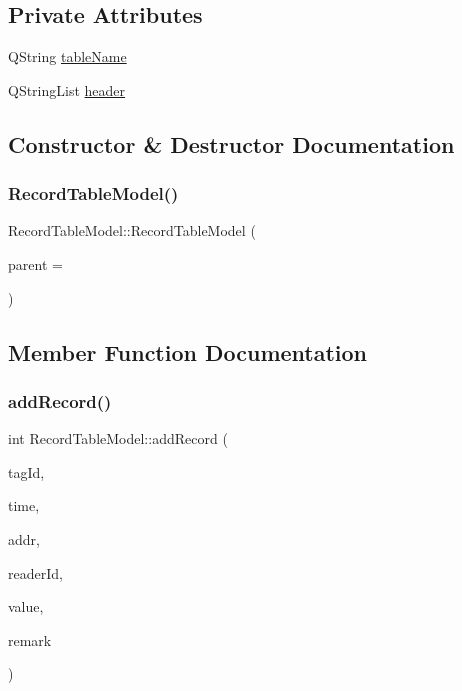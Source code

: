 \subsection*{Private Attributes}
\begin{DoxyCompactItemize}
\item 
Q\+String \mbox{\hyperlink{class_record_table_model_a845184d414cef77094c51f2ce839ff8e}{table\+Name}}
\item 
Q\+String\+List \mbox{\hyperlink{class_record_table_model_aa1e8b825bbdee1a7cb35a236b767cded}{header}}
\end{DoxyCompactItemize}


\subsection{Constructor \& Destructor Documentation}
\mbox{\label{class_record_table_model_a003ba0c419c1f3667db260a9fba46421}} 
\subsubsection{\texorpdfstring{RecordTableModel()}{RecordTableModel()}}
{\footnotesize\ttfamily Record\+Table\+Model\+::\+Record\+Table\+Model (\begin{DoxyParamCaption}\item[{Q\+Object $\ast$}]{parent = {} }\end{DoxyParamCaption})\hspace{0.3cm}{\ttfamily [explicit]}}



\subsection{Member Function Documentation}
\mbox{\label{class_record_table_model_a2dd9d26f03858e1393946baba8f14510}} 
\subsubsection{\texorpdfstring{addRecord()}{addRecord()}}
{\footnotesize\ttfamily int Record\+Table\+Model\+::add\+Record (\begin{DoxyParamCaption}\item[{Q\+String \&}]{tag\+Id,  }\item[{Q\+String \&}]{time,  }\item[{Q\+String \&}]{addr,  }\item[{Q\+String \&}]{reader\+Id,  }\item[{Q\+String \&}]{value,  }\item[{Q\+String}]{remark }\end{DoxyParamCaption})}



